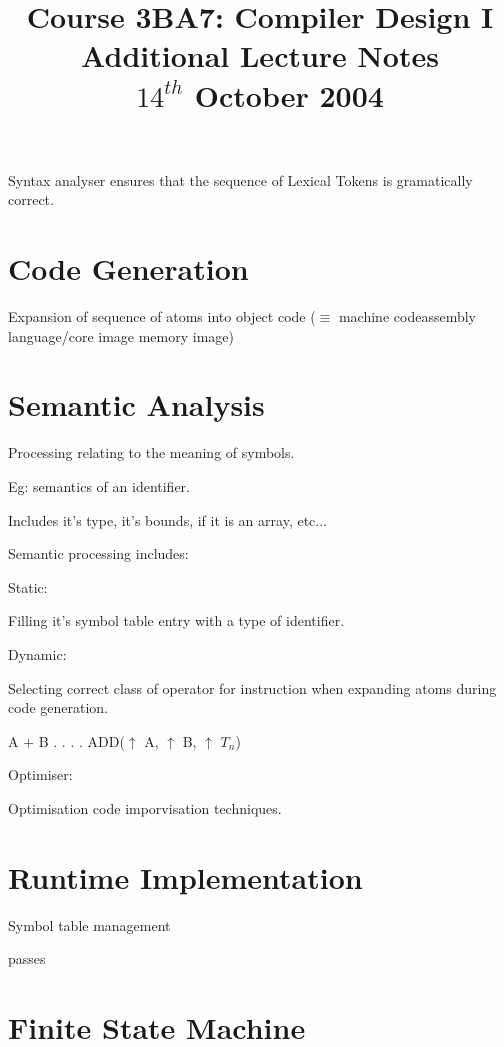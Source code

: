 \documentclass[a4paper,12pt]{article}
\begin{document}
\title{Course 3BA7: Compiler Design I \\ Additional Lecture Notes \\ $14^{th}$ October 2004}

\maketitle

Syntax analyser ensures that the sequence of Lexical Tokens is
gramatically correct.

\section{Code Generation}

Expansion of sequence of atoms into object code ($\equiv$ machine
codeassembly language/core image memory image)


\section{Semantic Analysis}

Processing relating to the meaning of symbols.

Eg: semantics of an identifier.

	Includes it's type, it's bounds, if it is an array, etc...

Semantic processing includes:

	Static:

		Filling it's symbol table entry with a type of identifier.

	Dynamic:	

		Selecting correct class of operator for instruction when expanding
		atoms during code generation.


A + B
.
.
.
.
ADD($\uparrow$ A, $\uparrow$ B, $\uparrow$ $T_{n}$)


Optimiser:

Optimisation code imporvisation techniques.


\section{Runtime Implementation}

Symbol table management

passes

\section{Finite State Machine}
\end{document}
